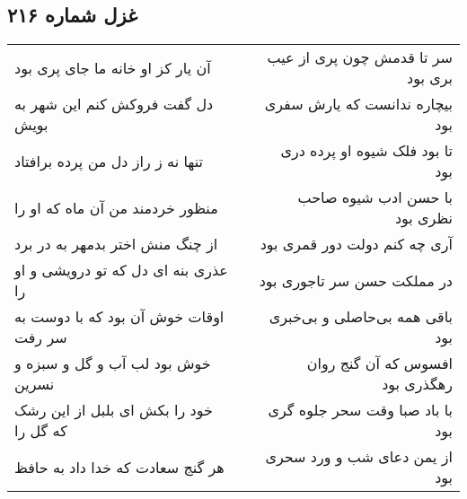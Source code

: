 \begin{center}
\section*{غزل شماره ۲۱۶}
\label{sec:sh216}
\begin{longtable}{l p{0.5cm} r}
آن یار کز او خانه ما جای پری بود
&&
سر تا قدمش چون پری از عیب بری بود
\\
دل گفت فروکش کنم این شهر به بویش
&&
بیچاره ندانست که یارش سفری بود
\\
تنها نه ز راز دل من پرده برافتاد
&&
تا بود فلک شیوه او پرده دری بود
\\
منظور خردمند من آن ماه که او را
&&
با حسن ادب شیوه صاحب نظری بود
\\
از چنگ منش اختر بدمهر به در برد
&&
آری چه کنم دولت دور قمری بود
\\
عذری بنه ای دل که تو درویشی و او را
&&
در مملکت حسن سر تاجوری بود
\\
اوقات خوش آن بود که با دوست به سر رفت
&&
باقی همه بی‌حاصلی و بی‌خبری بود
\\
خوش بود لب آب و گل و سبزه و نسرین
&&
افسوس که آن گنج روان رهگذری بود
\\
خود را بکش ای بلبل از این رشک که گل را
&&
با باد صبا وقت سحر جلوه گری بود
\\
هر گنج سعادت که خدا داد به حافظ
&&
از یمن دعای شب و ورد سحری بود
\\
\end{longtable}
\end{center}
